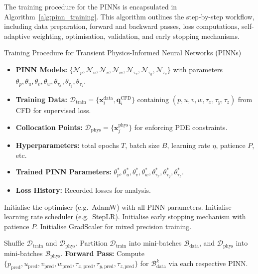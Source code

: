 \documentclass[12pt, a4paper]{article}
\begin{document}
The training procedure for the PINNs is encapsulated in Algorithm~\ref{alg:pinn_training}. This algorithm outlines the step-by-step workflow, including data preparation, forward and backward passes, loss computations, self-adaptive weighting, optimisation, validation, and early stopping mechanisms.

\begin{algorithm}[H]
\caption{Training Procedure for Transient Physics-Informed Neural Networks (PINNs)}
\label{alg:pinn_training}
\begin{algorithmic}[1]

\Require
\begin{itemize}
    \item \textbf{PINN Models:} $\{\mathcal{N}_p, \mathcal{N}_u, \mathcal{N}_v, \mathcal{N}_w, \mathcal{N}_{\tau_x}, \mathcal{N}_{\tau_y}, \mathcal{N}_{\tau_z}\}$ with parameters $\theta_p, \theta_u, \theta_v, \theta_w, \theta_{\tau_x}, \theta_{\tau_y}, \theta_{\tau_z}$.
    \item \textbf{Training Data:} $\mathcal{D}_{\text{train}} = \{\mathbf{x}_i^{\text{data}}, \mathbf{q}_i^{\text{CFD}}\}$ containing $(p,u,v,w,\tau_x,\tau_y,\tau_z)$ from CFD for supervised loss.
    \item \textbf{Collocation Points:} $\mathcal{D}_{\text{phys}} = \{\mathbf{x}_j^{\text{phys}}\}$ for enforcing PDE constraints.
    \item \textbf{Hyperparameters:} total epochs $T$, batch size $B$, learning rate $\eta$, patience $P$, etc.
\end{itemize}

\Ensure
\begin{itemize}
    \item \textbf{Trained PINN Parameters:} $\theta_p^*, \theta_u^*, \theta_v^*, \theta_w^*, \theta_{\tau_x}^*, \theta_{\tau_y}^*, \theta_{\tau_z}^*$.
    \item \textbf{Loss History:} Recorded losses for analysis.
\end{itemize}

\Statex

\State Initialise the optimiser (e.g.\ AdamW) with all PINN parameters.
\State Initialise learning rate scheduler (e.g.\ StepLR).
\State Initialise early stopping mechanism with patience $P$.
\State Initialise GradScaler for mixed precision training.

    \State Shuffle $\mathcal{D}_{\text{train}}$ and $\mathcal{D}_{\text{phys}}$.
    \State Partition $\mathcal{D}_{\text{train}}$ into mini-batches $\mathcal{B}_{\text{data}}$, and $\mathcal{D}_{\text{phys}}$ into mini-batches $\mathcal{B}_{\text{phys}}$.
        \State \textbf{Forward Pass:}
        \State Compute $\{p_{\text{pred}}, u_{\text{pred}}, v_{\text{pred}}, w_{\text{pred}}, \tau_{x,\text{pred}}, \tau_{y,\text{pred}}, \tau_{z,\text{pred}}\}$ for $\mathcal{B}_{\text{data}}^k$ via each respective PINN.
        

\end{algorithmic}
\end{algorithm}
\end{document}
